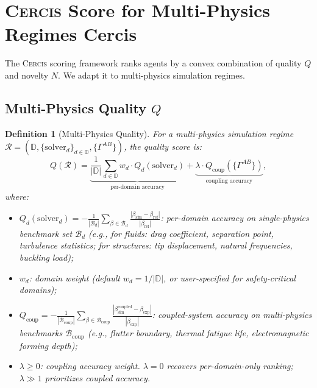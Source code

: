 \documentclass[11pt,a4paper]{article}
\newtheorem{definition}[theorem]{Definition}
\theoremstyle{definition}
\newcommand{\Cercis}{\textsc{Cercis}}
\newcommand{\domains}{\mathbb{D}}
\newcommand{\interface}{\Gamma}
\begin{document}
\section{\Cercis{} Score for Multi-Physics Regimes Cercis}
\label{sec:cercis}

The \Cercis{} scoring framework \cite{SCX2025} ranks agents by a convex combination of quality $Q$ and novelty $N$. We adapt it to multi-physics simulation regimes.

\subsection{Multi-Physics Quality $Q$}

\begin{definition}[Multi-Physics Quality]\label{def:Q_mp}
For a multi-physics simulation regime $\mathcal{R} = (\domains, \{\text{solver}_d\}_{d \in \domains}, \{\interface^{AB}\})$, the quality score is:
\begin{equation}\label{eq:Q_mp}
Q(\mathcal{R}) = \underbrace{\frac{1}{|\domains|}\sum_{d \in \domains} w_d \cdot Q_d(\text{solver}_d)}_{\text{per-domain accuracy}} + \underbrace{\lambda \cdot Q_{\mathrm{coup}}(\{\interface^{AB}\})}_{\text{coupling accuracy}},
\end{equation}
where:
\begin{itemize}
    \item $Q_d(\text{solver}_d) = -\frac{1}{|\mathcal{B}_d|}\sum_{\beta \in \mathcal{B}_d} \frac{|\beta_{\mathrm{sim}} - \beta_{\mathrm{ref}}|}{|\beta_{\mathrm{ref}}|}$: per-domain accuracy on single-physics benchmark set $\mathcal{B}_d$ (e.g., for fluids: drag coefficient, separation point, turbulence statistics; for structures: tip displacement, natural frequencies, buckling load);
    \item $w_d$: domain weight (default $w_d = 1/|\domains|$, or user-specified for safety-critical domains);
    \item $Q_{\mathrm{coup}} = -\frac{1}{|\mathcal{B}_{\mathrm{coup}}|}\sum_{\beta \in \mathcal{B}_{\mathrm{coup}}} \frac{|\beta_{\mathrm{sim}}^{\mathrm{coupled}} - \beta_{\mathrm{exp}}|}{|\beta_{\mathrm{exp}}|}$: coupled-system accuracy on multi-physics benchmarks $\mathcal{B}_{\mathrm{coup}}$ (e.g., flutter boundary, thermal fatigue life, electromagnetic forming depth);
    \item $\lambda \geq 0$: coupling accuracy weight. $\lambda = 0$ recovers per-domain-only ranking; $\lambda \gg 1$ prioritizes coupled accuracy.
\end{itemize}
\end{definition}
\end{document}
